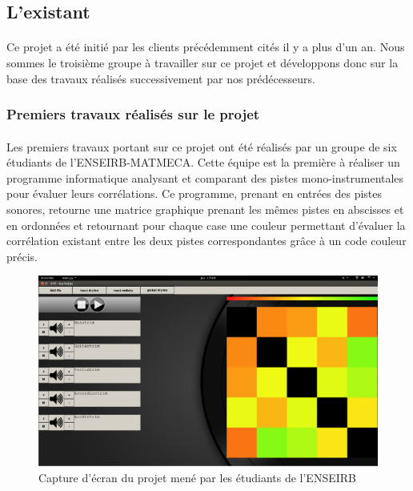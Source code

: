 \subsection{L'existant}
\paragraph{}
Ce projet a été initié par les clients précédemment cités il y a plus
d'un an. Nous sommes le troisième groupe à travailler sur ce projet et
développons donc sur la base des travaux réalisés successivement par
nos prédécesseurs.

\subsubsection{Premiers travaux réalisés sur le projet}
\paragraph{}
Les premiers travaux portant sur ce projet ont été réalisés par un
groupe de six étudiants de l'ENSEIRB-MATMECA. Cette équipe est la
première à réaliser un programme informatique analysant et comparant
des pistes mono-instrumentales pour évaluer leurs corrélations. Ce
programme, prenant en entrées des pistes sonores, retourne une matrice
graphique prenant les mêmes pistes en abscisses et en ordonnées et
retournant pour chaque case une couleur permettant d'évaluer la
corrélation existant entre les deux pistes correspondantes grâce à un
code couleur précis.

\begin{figure}[H]
 \centering
 \includegraphics[scale=0.5]{assets/matriceenseirb.png}
 \caption{Capture d'écran du projet mené par les étudiants de l'ENSEIRB}
 \label{matrice-enseirb}
\end{figure}

